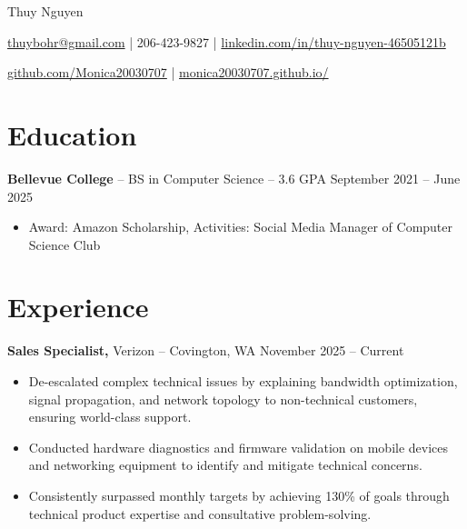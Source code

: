 \documentclass[11pt]{article}       %
\begin{document}
\centerline{\Huge Thuy Nguyen}

\vspace{5pt}

\centerline{\href{mailto:thuybohr@gmail.com}{thuybohr@gmail.com} | 206-423-9827 |
\href{https://www.linkedin.com/in/thuy-nguyen-46505121b/}{linkedin.com/in/thuy-nguyen-46505121b}}

\centerline{\href{https://github.com/Monica20030707}{github.com/Monica20030707} | 
\href{https://monica20030707.github.io/}{monica20030707.github.io/}} 

\vspace{-9pt}

\section*{Education}
\textbf{Bellevue College} -- BS in Computer Science -- 3.6 GPA \hfill September 2021 -- June 2025\\
\vspace{-9pt}
\begin{itemize}
  \item Award: Amazon Scholarship, Activities: Social Media Manager of Computer Science Club
\end{itemize}

\vspace{-18.5pt}

\section*{Experience}

\textbf{Sales Specialist,} {Verizon} -- Covington, WA \hfill November 2025 -- Current \\
\vspace{-9pt}
\begin{itemize}
  \item De-escalated complex technical issues by explaining bandwidth optimization, signal propagation, and network topology to non-technical customers, ensuring world-class support.
  \item Conducted hardware diagnostics and firmware validation on mobile devices and networking equipment to identify and mitigate technical concerns.
  \item Consistently surpassed monthly targets by achieving 130\% of goals through technical product expertise and consultative problem-solving.
\end{itemize}
\end{document}
